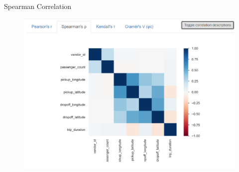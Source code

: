 \documentclass[
 size=14pt,
 paper=smartboard,  %
 mode=present, 		%
 display=slides, 	%
 style=tuliplab,  	%
 pauseslide,
 fleqn,leqno]{powerdot}
\begin{document}
\begin{slide}{Spearman Correlation}
  \begin{center}
    \begin{figure}
    \includegraphics[scale=0.4]{figures/two.eps}
    \end{figure}
  \end{center}





\end{slide}
\end{document}
